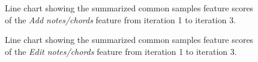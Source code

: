		\begin{figure}[H]
			\centering
		    \caption{Line chart showing the summarized common samples feature scores of the \textit{Add notes/chords} feature from iteration 1 to iteration 3.}
		    \label{fig:add-line}
		\end{figure} 

		\begin{figure}[H]
			\centering
		    \caption{Line chart showing the summarized common samples feature scores of the \textit{Edit notes/chords} feature from iteration 1 to iteration 3.}
		    \label{fig:edit-line}
		\end{figure} 


